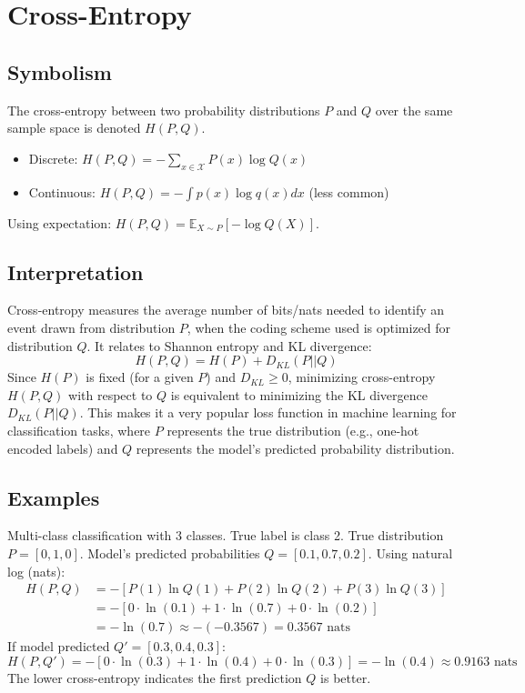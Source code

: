 \documentclass{article}
\newcommand{\E}{\mathbb{E}}    %
\begin{document}
\section{Cross-Entropy}

\subsection*{Symbolism}
The cross-entropy between two probability distributions $P$ and $Q$ over the same sample space is denoted $H(P, Q)$.
\begin{itemize}
    \item Discrete: $H(P, Q) = - \sum_{x \in \mathcal{X}} P(x) \log Q(x)$
    \item Continuous: $H(P, Q) = - \int p(x) \log q(x) dx$ (less common)
\end{itemize}
Using expectation: $H(P, Q) = \E_{X \sim P} [-\log Q(X)]$.

\subsection*{Interpretation}
Cross-entropy measures the average number of bits/nats needed to identify an event drawn from distribution $P$, when the coding scheme used is optimized for distribution $Q$.
It relates to Shannon entropy and KL divergence:
\[ H(P, Q) = H(P) + D_{KL}(P || Q) \]
Since $H(P)$ is fixed (for a given $P$) and $D_{KL} \ge 0$, minimizing cross-entropy $H(P, Q)$ with respect to $Q$ is equivalent to minimizing the KL divergence $D_{KL}(P || Q)$. This makes it a very popular loss function in machine learning for classification tasks, where $P$ represents the true distribution (e.g., one-hot encoded labels) and $Q$ represents the model's predicted probability distribution.

\subsection*{Examples}
Multi-class classification with 3 classes. True label is class 2.
True distribution $P = [0, 1, 0]$.
Model's predicted probabilities $Q = [0.1, 0.7, 0.2]$.
Using natural log (nats):
\begin{align*} H(P, Q) &= - [ P(1)\ln Q(1) + P(2)\ln Q(2) + P(3)\ln Q(3) ] \\ &= - [ 0 \cdot \ln(0.1) + 1 \cdot \ln(0.7) + 0 \cdot \ln(0.2) ] \\ &= - \ln(0.7) \approx -(-0.3567) = 0.3567 \text{ nats} \end{align*}
If model predicted $Q' = [0.3, 0.4, 0.3]$:
\[ H(P, Q') = - [ 0 \cdot \ln(0.3) + 1 \cdot \ln(0.4) + 0 \cdot \ln(0.3) ] = - \ln(0.4) \approx 0.9163 \text{ nats} \]
The lower cross-entropy indicates the first prediction $Q$ is better.
\end{document}

